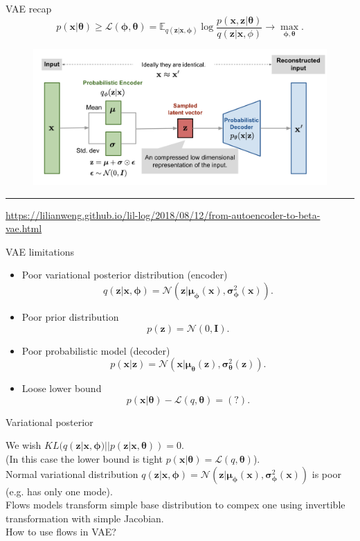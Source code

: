 \documentclass{beamer}
\newcommand{\bx}{\mathbf{x}}
\newcommand{\bz}{\mathbf{z}}
\newcommand{\bmu}{\boldsymbol{\mu}}
\newcommand{\bsigma}{\boldsymbol{\sigma}}
\newcommand{\btheta}{\boldsymbol{\theta}}
\newcommand{\bphi}{\boldsymbol{\phi}}
\begin{document}
\begin{frame}{VAE recap}
	\vspace{-0.5cm}
	\[
	p(\bx | \btheta) \geq \mathcal{L} (\bphi, \btheta)  = \mathbb{E}_{q(\bz | \bx, \bphi)} \log \frac{p(\bx, \bz | \btheta)}{q(\bz| \bx, \phi)} \rightarrow \max_{\bphi, \btheta}.
	\]
	\vspace{-0.5cm}
	\begin{figure}[h]
		\centering
		\includegraphics[width=\linewidth]{figs/vae-gaussian.png}
	\end{figure}
	\hrule\medskip
	{\scriptsize \href{https://lilianweng.github.io/lil-log/2018/08/12/from-autoencoder-to-beta-vae.html}{https://lilianweng.github.io/lil-log/2018/08/12/from-autoencoder-to-beta-vae.html}}
	
\end{frame}
\begin{frame}{VAE limitations}
	\begin{itemize}
		\item Poor variational posterior distribution (encoder)
		\[
		q(\bz | \bx, \bphi) = \mathcal{N}(\bz| \bmu_{\bphi}(\bx), \bsigma^2_{\bphi}(\bx)).
		\]
		\item Poor prior distribution
		\[
		p(\bz) = \mathcal{N}(0, \mathbf{I}).
		\]
		\item Poor probabilistic model (decoder)
		\[
		p(\bx | \bz) = \mathcal{N}(\bx| \bmu_{\btheta}(\bz), \bsigma^2_{\btheta}(\bz)).
		\]
		\item Loose lower bound
		\[
		p(\bx | \btheta) - \mathcal{L}(q, \btheta) = (?).
		\]
	\end{itemize}
\end{frame}
\begin{frame}{Variational posterior}
	
	We wish $KL(q(\bz | \bx, \bphi) || p(\bz | \bx, \btheta)) = 0$. \\
	(In this case the lower bound is tight $p(\bx | \btheta) = \mathcal{L}(q, \btheta)$). \\
	\vspace{0.5cm}
	Normal variational distribution $q(\bz | \bx, \bphi) = \mathcal{N}(\bz| \bmu_{\bphi}(\bx), \bsigma^2_{\bphi}(\bx))$ is poor (e.g. has only one mode). \\
	\vspace{0.5cm}
	Flows models transform simple base distribution to compex one using invertible transformation with simple Jacobian. \\
	\vspace{0.5cm}
	How to use flows in VAE?
\end{frame}
\end{document}
